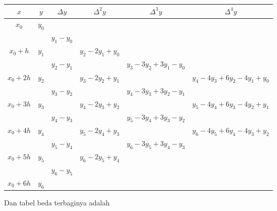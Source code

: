 \begin{table}[!htbp]
\footnotesize 
\begin{tabular}{@{}|c|c|c|c|c|c|@{}}
\hline
$x$  & $y$  & $\Delta y$ & $\Delta^2 y$ & $\Delta^3 y$ & $\Delta^4 y$\\\hline
$x_0$ & $y_0$ & & & &\\
& & $y_1 - y_0$ & & &\\
$x_0 + h$ & $y_1$ & & $y_2 - 2y_1 + y_0$ & &\\
& & $y_2 - y_1$ & & $y_3 - 3y_2 + 3y_1 - y_0$ & \\
$x_0 + 2h$ & $y_2$ & & $y_3 - 2y_2 + y_1$ & & $y_4 - 4y_3 + 6y_2 - 4y_1 + y_0$ \\
& & $y_3 - y_2$ & & $y_4 - 3y_3 + 3y_2 - y_1$ & \\
$x_0 + 3h$ & $y_3$ & & $y_4 - 2y_3 + y_2$ & & $y_5 - 4y_4 + 6y_3 - 4y_2 + y_1$ \\
& & $y_4 - y_3$ & & $y_5 - 3y_4 + 3y_3 - y_2$ & \\
$x_0 + 4h$ & $y_4$ & & $y_5 - 2y_4 + y_3$ & & $y_6 - 4y_5 + 6y_4 - 4y_3 + y_2$ \\
& & $y_5 - y_4$ & & $y_6 - 3y_5 + 3y_4 - y_3$ & \\
$x_0 + 5h$ & $y_5$ & & $y_6 - 2y_5 + y_4$ & & \\
& & $y_6 - y_5$ & & & \\
$x_0 + 6h$ & $y_6$ & & & & \\\hline
\end{tabular}
\end{table}

Dan tabel beda terbaginya adalah

